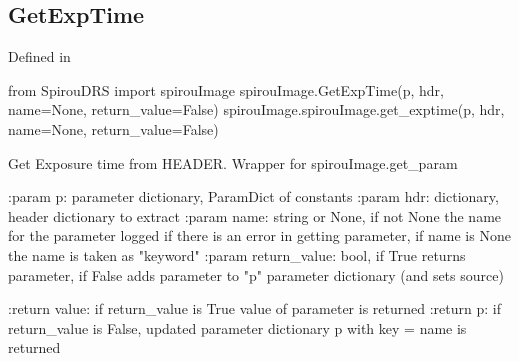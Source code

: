 \noindent\begin{minipage}{\textwidth}
\subsection{GetExpTime}

Defined in \spirouImage{}

\begin{pythonbox}
from SpirouDRS import spirouImage
spirouImage.GetExpTime(p, hdr, name=None, return_value=False)
spirouImage.spirouImage.get_exptime(p, hdr, name=None, return_value=False)
\end{pythonbox}

\begin{pythondocstring}
Get Exposure time from HEADER. Wrapper for spirouImage.get_param

:param p: parameter dictionary, ParamDict of constants
:param hdr: dictionary, header dictionary to extract
:param name: string or None, if not None the name for the parameter
             logged if there is an error in getting parameter, if name is
             None the name is taken as "keyword"
:param return_value: bool, if True returns parameter, if False adds
                     parameter to "p" parameter dictionary (and sets source)

:return value: if return_value is True value of parameter is returned
:return p: if return_value is False, updated parameter dictionary p with
           key = name is returned
\end{pythondocstring}
\end{minipage}


